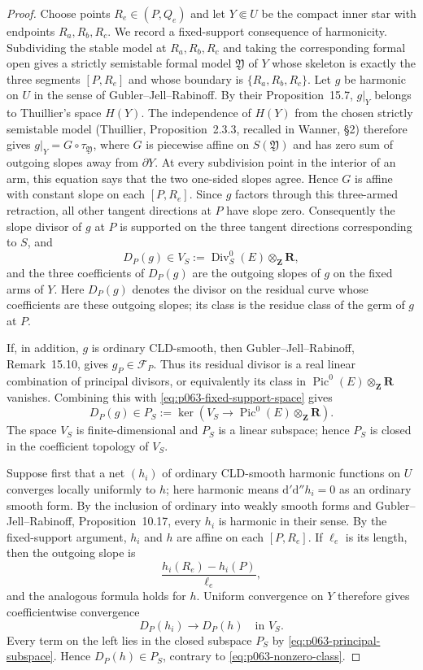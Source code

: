 \begin{proof}
Choose points $R_e\in(P,Q_e)$ and let $Y\Subset U$ be the compact inner
star with endpoints $R_a,R_b,R_c$.  We record a fixed-support consequence
of harmonicity.  Subdividing the stable model at $R_a,R_b,R_c$ and taking
the corresponding formal open gives a strictly semistable formal model
$\mathfrak Y$ of $Y$ whose skeleton is exactly the three segments
$[P,R_e]$ and whose boundary is $\{R_a,R_b,R_c\}$.  Let $g$ be harmonic on
$U$ in the sense of Gubler--Jell--Rabinoff.  By their Proposition~15.7,
$g|_Y$ belongs to Thuillier's space $H(Y)$.  The independence of
$H(Y)$ from the chosen strictly semistable model (Thuillier,
Proposition~2.3.3, recalled in Wanner, \S2) therefore gives
$g|_Y=G\circ\tau_{\mathfrak Y}$, where $G$ is piecewise affine on
$S(\mathfrak Y)$ and has zero sum of outgoing slopes away from
$\partial Y$.  At every subdivision point in the interior of an arm, this
equation says that the two one-sided slopes agree.  Hence $G$ is affine
with constant slope on each $[P,R_e]$.  Since $g$ factors through this
three-armed retraction, all other tangent directions at $P$ have slope
zero.  Consequently the slope divisor of $g$ at $P$ is supported on the
three tangent directions corresponding to $S$, and
\[
       D_P(g)\in
       V_S:=\operatorname{Div}^0_S(E)\otimes_{\mathbf Z}\mathbf R,
\tag{4}\label{eq:p063-fixed-support-space}
\]
and the three coefficients of $D_P(g)$ are the outgoing slopes of $g$ on
the fixed arms of $Y$.  Here $D_P(g)$ denotes the divisor on the residual
curve whose coefficients are these outgoing slopes; its class is the
residue class of the germ of $g$ at $P$.

If, in addition, $g$ is ordinary CLD-smooth, then Gubler--Jell--Rabinoff,
Remark~15.10, gives $g_P\in\mathcal F_P$.  Thus its residual divisor is a
real linear combination of principal divisors, or equivalently its class
in $\operatorname{Pic}^0(E)\otimes_{\mathbf Z}\mathbf R$ vanishes.
Combining this with
\eqref{eq:p063-fixed-support-space} gives
\[
 D_P(g)\in
 P_S:=\ker\!\left(
 V_S\longrightarrow\operatorname{Pic}^0(E)\otimes_{\mathbf Z}\mathbf R
 \right).
\tag{5}\label{eq:p063-principal-subspace}
\]
The space $V_S$ is finite-dimensional and $P_S$ is a linear subspace;
hence $P_S$ is closed in the coefficient topology of $V_S$.

Suppose first that a net $(h_i)$ of ordinary CLD-smooth harmonic functions
on $U$ converges locally uniformly to $h$; here harmonic means
$\mathrm d'\mathrm d''h_i=0$ as an ordinary smooth form.  By the
inclusion of ordinary into weakly smooth forms and
Gubler--Jell--Rabinoff, Proposition~10.17, every $h_i$ is harmonic in their
sense.  By the fixed-support argument,
$h_i$ and $h$ are
affine on each $[P,R_e]$.  If $\ell_e$ is its length, then the outgoing
slope is
\[
          \frac{h_i(R_e)-h_i(P)}{\ell_e},
\tag{6}\label{eq:p063-slope-from-values}
\]
and the analogous formula holds for $h$.  Uniform convergence on $Y$
therefore gives coefficientwise convergence
\[
                         D_P(h_i)\longrightarrow D_P(h)
                         \quad\text{in }V_S.
\tag{7}\label{eq:p063-divisor-convergence}
\]
Every term on the left lies in the closed subspace $P_S$ by
\eqref{eq:p063-principal-subspace}.  Hence $D_P(h)\in P_S$, contrary to
\eqref{eq:p063-nonzero-class}.


\end{proof}

